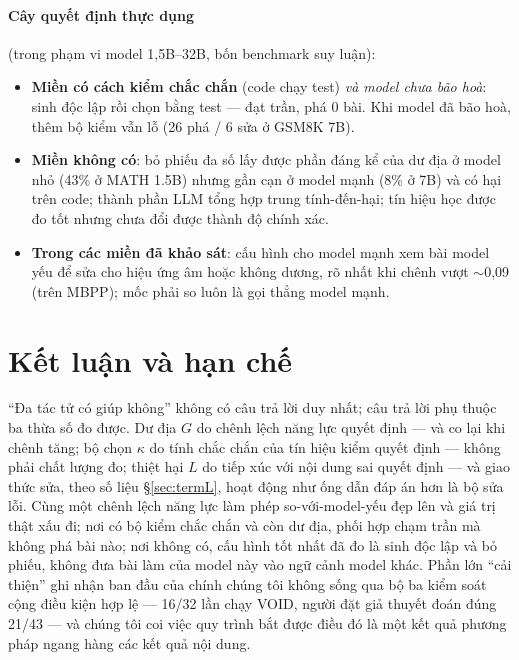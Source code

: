 \documentclass[11pt,a4paper]{article}
\begin{document}
\paragraph{Cây quyết định thực dụng} (trong phạm vi model 1,5B--32B, bốn benchmark suy luận):
\begin{itemize}\itemsep2pt
\item \textbf{Miền có cách kiểm chắc chắn} (code chạy test) \emph{và model chưa bão hoà}: sinh
      độc lập rồi chọn bằng test --- đạt trần, phá 0 bài. Khi model đã bão hoà, thêm bộ kiểm
      vẫn lỗ (26 phá / 6 sửa ở GSM8K 7B).
\item \textbf{Miền không có}: bỏ phiếu đa số lấy được phần đáng kể của dư địa ở model nhỏ
      (43\% ở MATH 1.5B) nhưng gần cạn ở model mạnh (8\% ở 7B) và có hại trên code; thành phần
      LLM tổng hợp trung tính-đến-hại; tín hiệu học được đo tốt nhưng chưa đổi được thành độ
      chính xác.
\item \textbf{Trong các miền đã khảo sát}: cấu hình cho model mạnh xem bài model yếu để sửa cho
      hiệu ứng âm hoặc không dương, rõ nhất khi chênh vượt $\sim$0,09 (trên MBPP); mốc phải so
      luôn là gọi thẳng model mạnh.
\end{itemize}

\section{Kết luận và hạn chế}\label{sec:limits}

``Đa tác tử có giúp không'' không có câu trả lời duy nhất; câu trả lời phụ thuộc ba thừa số đo
được. Dư địa $G$ do chênh lệch năng lực quyết định --- và co lại khi chênh tăng; bộ chọn
$\kappa$ do tính chắc chắn của tín hiệu kiểm quyết định --- không phải chất lượng đo; thiệt hại
$L$ do tiếp xúc với nội dung sai quyết định --- và giao thức sửa, theo số liệu
\S\ref{sec:termL}, hoạt động như ống dẫn đáp án hơn là bộ sửa lỗi. Cùng một chênh lệch năng lực
làm phép so-với-model-yếu đẹp lên và giá trị thật xấu đi; nơi có bộ kiểm chắc chắn và còn dư
địa, phối hợp chạm trần mà không phá bài nào; nơi không có, cấu hình tốt nhất đã đo là sinh độc
lập và bỏ phiếu, không đưa bài làm của model này vào ngữ cảnh model khác. Phần lớn ``cải
thiện'' ghi nhận ban đầu của chính chúng tôi không sống qua bộ ba kiểm soát cộng điều kiện hợp
lệ --- 16/32 lần chạy VOID, người đặt giả thuyết đoán đúng 21/43 --- và chúng tôi coi việc quy
trình bắt được điều đó là một kết quả phương pháp ngang hàng các kết quả nội dung.
\end{document}
